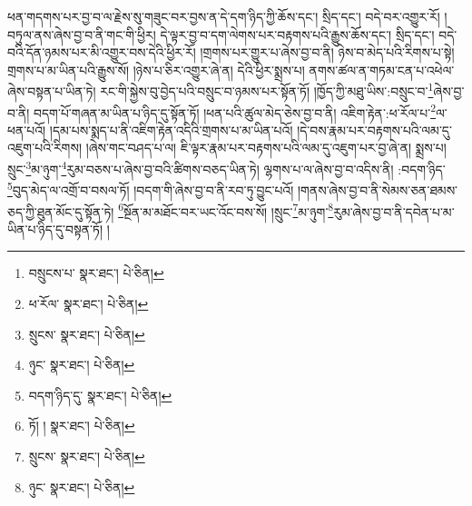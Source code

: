 ཕན་གདགས་པར་བྱ་བ་ལ་རྗེས་སུ་གཟུང་བར་བྱས་ན་དེ་དག་ཉིད་ཀྱི་ཆོས་དང་། སྲིད་དང་། བདེ་བར་འགྱུར་རོ། །བཏུལ་ནས་ཞེས་བྱ་བ་ནི་གང་གི་ཕྱིར། དེ་ལྟར་བྱ་བ་དག་ལེགས་པར་བརྟགས་པའི་རྒྱུས་ཆོས་དང་། སྲིད་དང་། བདེ་བའི་དོན་ཉམས་པར་མི་འགྱུར་བས་དེའི་ཕྱིར་རོ། །གྲགས་པར་གྱུར་པ་ཞེས་བྱ་བ་ནི། ཉེས་བ་མེད་པའི་རིགས་པ་སྟེ། གྲགས་པ་མ་ཡིན་པའི་རྒྱུས་སོ། །ཉེས་པ་ཅིར་འགྱུར་ཞེ་ན། དེའི་ཕྱིར་སྨྲས་པ། ནགས་ཚལ་ན་གཏམ་ངན་པ་འཕེལ་ཞེས་བསྟན་པ་ཡིན་ཏེ། རང་གི་སྐྱེས་བུ་བྱེད་པའི་བསྲུང་བ་ཉམས་པར་སྟོན་ཏོ། །ཁྱོད་ཀྱི་མཐུ་ཡིས་:བསྲུང་བ་\footnote{བསྲུངས་པ་  སྣར་ཐང་།  པེ་ཅིན། }ཞེས་བྱ་བ་ནི། བདག་པོ་གཞན་མ་ཡིན་པ་ཉིད་དུ་སྟོན་ཏོ། །ཕན་པའི་ཚུལ་མེད་ཅེས་བྱ་བ་ནི། འཇིག་རྟེན་:ཕ་རོལ་པ་\footnote{ཕ་རོལ་  སྣར་ཐང་།  པེ་ཅིན། }ལ་ཕན་པའོ། །དམ་པས་སྨད་པ་ནི་འཇིག་རྟེན་འདིའི་གྲགས་པ་མ་ཡིན་པའོ། །དེ་བས་རྣམ་པར་བརྟགས་པའི་ལམ་དུ་འཇུག་པའི་རིགས། །ཞེས་གང་བཤད་པ་ལ། ཇི་ལྟར་རྣམ་པར་བརྟགས་པའི་ལམ་དུ་འཇུག་པར་བྱ་ཞེ་ན། སྨྲས་པ། སྲུང་\footnote{སྲུངས་  སྣར་ཐང་།  པེ་ཅིན། }མ་ཉུག་\footnote{ཉུང་  སྣར་ཐང་།  པེ་ཅིན། }རུམ་བཅས་པ་ཞེས་བྱ་བའི་ཚིགས་བཅད་ཡིན་ཏེ། ལྷགས་པ་ལ་ཞེས་བྱ་བ་འདིས་ནི། :བདག་ཉིད་\footnote{བདག་ཉིད་དུ་  སྣར་ཐང་།  པེ་ཅིན། }བུད་མེད་ལ་འགྲོ་བ་བསལ་ཏོ། །བདག་གི་ཞེས་བྱ་བ་ནི་རབ་ཏུ་བྱུང་པའོ། །གནས་ཞེས་བྱ་བ་ནི་སེམས་ཅན་ཐམས་ཅད་ཀྱི་ཐུན་མོང་དུ་སྟོན་ཏེ། \footnote{ཏོ། །   སྣར་ཐང་།  པེ་ཅིན། }སྔོན་མ་མཐོང་བར་ཡང་འོང་བས་སོ། །སྲུང་\footnote{སྲུངས་  སྣར་ཐང་།  པེ་ཅིན། }མ་ཉུག་\footnote{ཉུང་  སྣར་ཐང་།  པེ་ཅིན། }རུམ་ཞེས་བྱ་བ་ནི་དབེན་པ་མ་ཡིན་པ་ཉིད་དུ་བསྟན་ཏོ། །
